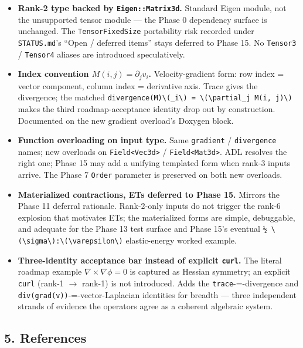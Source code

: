 \begin{itemize}
\item
  \textbf{Rank-2 type backed by \passthrough{\lstinline!Eigen::Matrix3d!}.}
  Standard Eigen module, not the unsupported tensor module — the
  Phase 0 dependency surface is unchanged. The
  \passthrough{\lstinline!TensorFixedSize!} portability risk recorded
  under \passthrough{\lstinline!STATUS.md!}'s ``Open / deferred items''
  stays deferred to Phase 15. No
  \passthrough{\lstinline!Tensor3!} /
  \passthrough{\lstinline!Tensor4!} aliases are introduced
  speculatively.
\item
  \textbf{Index convention
  \(M(i, j) = \partial_j v_i\).} Velocity-gradient form: row index =
  vector component, column index = derivative axis. Trace gives the
  divergence; the matched
  \passthrough{\lstinline!divergence(M)\(_i\) = \(\partial_j M(i, j)\)!}
  makes the third roadmap-acceptance identity drop out by
  construction. Documented on the new gradient overload's Doxygen
  block.
\item
  \textbf{Function overloading on input type.} Same
  \passthrough{\lstinline!gradient!} /
  \passthrough{\lstinline!divergence!} names; new overloads on
  \passthrough{\lstinline!Field<Vec3d>!} /
  \passthrough{\lstinline!Field<Mat3d>!}. ADL resolves the right one;
  Phase 15 may add a unifying templated form when rank-3 inputs
  arrive. The Phase 7
  \passthrough{\lstinline!Order!} parameter is preserved on both new
  overloads.
\item
  \textbf{Materialized contractions, ETs deferred to Phase 15.}
  Mirrors the Phase 11 deferral rationale. Rank-2-only inputs do not
  trigger the rank-6 explosion that motivates ETs; the materialized
  forms are simple, debuggable, and adequate for the Phase 13 test
  surface and Phase 15's eventual
  \passthrough{\lstinline!½ \(\sigma\):\(\varepsilon\)!} elastic-energy
  worked example.
\item
  \textbf{Three-identity acceptance bar instead of explicit
  \passthrough{\lstinline!curl!}.} The literal roadmap
  example \(\nabla\times\nabla\phi = 0\) is captured as Hessian
  symmetry; an explicit \passthrough{\lstinline!curl!} (rank-1
  \(\to\) rank-1) is not introduced. Adds the
  \passthrough{\lstinline!trace!}-=-divergence and
  \passthrough{\lstinline!div(grad(v))!}-=-vector-Laplacian
  identities for breadth — three independent strands of evidence the
  operators agree as a coherent algebraic system.
\end{itemize}

\subsection{5. References}\label{phase13-references}


